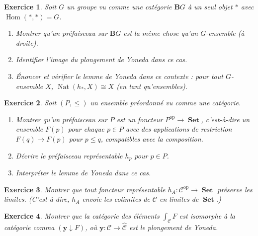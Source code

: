 \documentclass[a4paper,12pt]{book}
\DeclareMathOperator{\Hom}{Hom}
\DeclareMathOperator{\Nat}{Nat}
\DeclareMathOperator{\Set}{\mathbf{Set}}
\newcommand{\op}{\mathrm{op}}
\newtheorem{exercice}{Exercice}[chapter]
\begin{document}
\begin{exercice}\label{exo:yoneda-groupes}
Soit $G$ un groupe vu comme une catégorie $\mathbf{B}G$ à un seul objet
$*$ avec $\Hom(*, *) = G$.
\begin{enumerate}[label=(\alph*)]
\item Montrer qu'un préfaisceau sur $\mathbf{B}G$ est la même chose
    qu'un $G$-ensemble (à droite).
\item Identifier l'image du plongement de Yoneda dans ce cas.
\item Énoncer et vérifier le lemme de Yoneda dans ce contexte :
    pour tout $G$-ensemble $X$,
    $\Nat(h_*, X) \cong X$ (en tant qu'ensembles).
\end{enumerate}
\end{exercice}

\begin{exercice}\label{exo:yoneda-preordre}
Soit $(P, \leq)$ un ensemble préordonné vu comme une catégorie.
\begin{enumerate}[label=(\alph*)]
\item Montrer qu'un préfaisceau sur $P$ est un foncteur
    $P^{\op} \to \Set$, c'est-à-dire un ensemble $F(p)$ pour chaque
    $p \in P$ avec des applications de restriction
    $F(q) \to F(p)$ pour $p \leq q$, compatibles avec la composition.
\item Décrire le préfaisceau représentable $h_p$ pour $p \in P$.
\item Interpréter le lemme de Yoneda dans ce cas.
\end{enumerate}
\end{exercice}

\begin{exercice}\label{exo:representable-limites}
Montrer que tout foncteur représentable $h_A \colon \mathcal{C}^{\op} \to \Set$
préserve les limites. (C'est-à-dire, $h_A$ envoie les colimites de
$\mathcal{C}$ en limites de $\Set$.)
\end{exercice}

\begin{exercice}\label{exo:elements-comma}
Montrer que la catégorie des éléments $\int_{\mathcal{C}} F$ est isomorphe
à la catégorie comma $(\mathbf{y} \downarrow F)$, où
$\mathbf{y} \colon \mathcal{C} \to \widehat{\mathcal{C}}$ est le plongement
de Yoneda.
\end{exercice}
\end{document}
